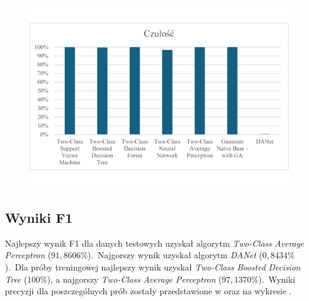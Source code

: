 \begin{figure}[H]
    \centering
    \includegraphics[width=\textwidth]{images/rec-res}
    \label{fig:rec-res}
\end{figure}

\subsection{Wyniki F1}
Najlepszy wynik F1 dla danych testowych uzyskał algorytm \textit{Two-Class Average Perceptron} ($91,8606\%$).\ Najgorszy wynik uzyskał algorytm \textit{DANet} ($0,8434\%$).\ Dla próby treningowej najlepszy wynik uzyskał \textit{Two-Class Boosted Decision Tree} ($100\%$), a najgorszy \textit{Two-Class Average Perceptron} ($97,1370\%$).\ Wyniki precyzji dla poszczególnych prób zostały przedstawione w  oraz na wykresie .

